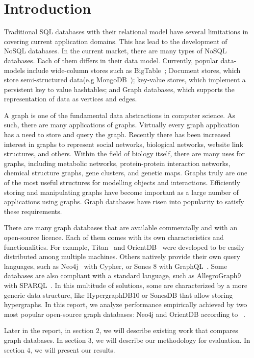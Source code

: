 \section{Introduction}

Traditional SQL databases with their relational model have several limitations in covering current application domains. This has lead to the development of NoSQL databases. In the current market, there are many types of NoSQL databases. Each of them differs in their data model. Currently, popular data-models include wide-column stores such as BigTable~\cite{chang2008bigtable}; Document stores, which store semi-structured data(e.g MongoDB~\cite{chodorow2013mongodb}); key-value stores, which implement a persistent key to value hashtables; and Graph databases, which supports the representation of data as vertices and edges.

A graph is one of the fundamental data abstractions in computer science. As such, there are many applications of graphs. Virtually every graph application has a need to store and query the graph. Recently there has been increased interest in graphs to represent social networks, biological networks, website link structures, and others. Within the field of biology itself, there are many uses for graphs, including metabolic networks, protein-protein interaction networks, chemical structure graphs, gene clusters, and genetic maps. Graphs truly are one of the most useful structures for modelling objects and interactions. Efficiently storing and manipulating graphs have become important as a large number of applications using graphs. Graph databases have risen into popularity to satisfy these requirements.

There are many graph databases that are available commercially and with an open-source licence. Each of them comes with its own characteristics and functionalities. For example, Titan~\cite{jouili2013empirical} and OrientDB~\cite{tesoriero2013getting} were developed to be easily distributed among multiple machines. Others natively provide their own query languages, such as Neo4j~\cite{holzschuher2013performance} with Cypher, or Sones 8 with GraphQL~\cite{vazquez2017improving}. Some databases are also compliant with a standard language, such as AllegroGraph9~\cite{abburu2013format} with SPARQL~\cite{abburu2013format}. In this multitude of solutions, some are characterized by a more generic data structure, like HypergraphDB10 or SonesDB that allow storing hypergraphs. In this report, we analyze performance empirically achieved by two most popular open-source graph databases: Neo4j and OrientDB according to ~\cite{dbranking}.

Later in the report, in section 2, we will describe existing work that compares graph databases. In section 3, we will describe our methodology for evaluation. In section 4, we will present our results.   




